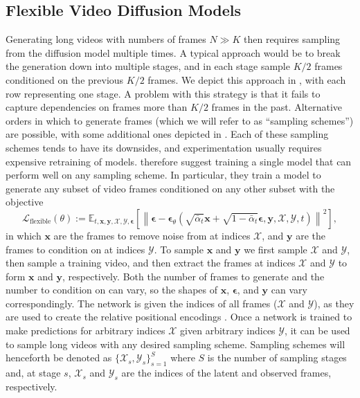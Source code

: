 \subsection{Flexible Video Diffusion Models}
Generating long videos with numbers of frames $N \gg K$ then requires sampling from the diffusion model multiple times. A typical approach would be to break the generation down into multiple stages, and in each stage sample $K/2$ frames conditioned on the previous $K/2$ frames. 
We depict this approach in , with each row representing one stage. A problem with this strategy is that it fails to capture dependencies on frames more than $K/2$ frames in the past. 
Alternative orders in which to generate frames (which we will refer to as ``sampling schemes'') are possible, with some additional ones depicted in . Each of these sampling schemes tends to have its downsides, and experimentation usually requires expensive retraining of models. 
\citet{fdm} therefore suggest training a single model that can perform well on any sampling scheme. In particular, they train a model to generate any subset of video frames conditioned on any other subset with the objective
\begin{equation}
    \mathcal{L}_{\text {flexible}}(\theta):=\mathbb{E}_{t, \mathbf{x}, \mathbf{y}, \mathcal{X}, \mathcal{Y}, \boldsymbol{\epsilon}}\left[\left\|\boldsymbol{\epsilon}-\boldsymbol{\epsilon}_\theta\left(\sqrt{\bar{\alpha}_t} \mathbf{x}+\sqrt{1-\bar{\alpha}_t} \boldsymbol{\epsilon}, \mathbf{y}, \mathcal{X}, \mathcal{Y}, t\right)\right\|^2\right],
    \label{eq:lflexible}
\end{equation}
in which $\mathbf{x}$ are the frames to remove noise from at indices $\mathcal{X}$, and $\mathbf{y}$ are the frames to condition on at indices $\mathcal{Y}$. 
To sample $\mathbf{x}$ and $\mathbf{y}$ we first sample $\mathcal{X}$ and $\mathcal{Y}$, then sample a training video, and then extract the frames at indices $\mathcal{X}$ and $\mathcal{Y}$ to form $\mathbf{x}$ and $\mathbf{y}$, respectively.
Both the number of frames to generate and the number to condition on can vary, so the shapes of $\mathbf{x}$, $\boldsymbol{\epsilon}$, and $\mathbf{y}$ can vary correspondingly. The network is given the indices of all frames ($\mathcal{X}$ and $\mathcal{Y}$), as they are used to create the relative positional encodings \citep{rpe1, rpe2}. 
Once a network is trained to make predictions for arbitrary indices $\mathcal{X}$ given arbitrary indices $\mathcal{Y}$, it can be used to sample long videos with any desired sampling scheme. Sampling schemes will henceforth be denoted as $\{\mathcal{X}_s, \mathcal{Y}_s\}_{s=1}^S$ where $S$ is the number of sampling stages and, at stage $s$, $\mathcal{X}_s$ and $\mathcal{Y}_s$ are the indices of the latent and observed frames, respectively. 



